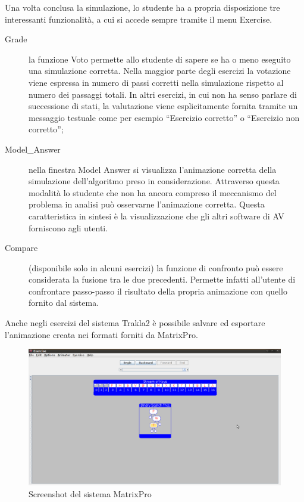 Una volta conclusa la simulazione, lo studente ha a propria disposizione
tre interessanti funzionalità, a cui si accede sempre tramite il menu
Exercise.
\begin{description}
\item [{Grade}] la funzione Voto permette allo studente di sapere se ha
o meno eseguito una simulazione corretta. Nella maggior parte degli
esercizi la votazione viene espressa in numero di passi corretti nella
simulazione rispetto al numero dei passaggi totali. In altri esercizi,
in cui non ha senso parlare di successione di stati, la valutazione
viene esplicitamente fornita tramite un messaggio testuale come per
esempio {}``Esercizio corretto'' o {}``Esercizio non corretto'';
\item [{Model\_Answer}] nella finestra Model Answer si visualizza l'animazione
corretta della simulazione dell'algoritmo preso in considerazione.
Attraverso questa modalità lo studente che non ha ancora compreso
il meccanismo del problema in analisi può osservarne l'animazione
corretta. Questa caratteristica in sintesi è la visualizzazione che
gli altri software di AV forniscono agli utenti.
\item [{Compare}] (disponibile solo in alcuni esercizi) la funzione di
confronto può essere considerata la fusione tra le due precedenti.
Permette infatti all'utente di confrontare passo-passo il risultato
della propria animazione con quello fornito dal sistema.
\end{description}
Anche negli esercizi del sistema Trakla2 è possibile salvare ed esportare
l'animazione creata nei formati forniti da MatrixPro.

\begin{figure}
\centering
\includegraphics[scale=0.35]{images/trakla_screenshot.png}
\caption{Screenshot del sistema MatrixPro}
\end{figure}


